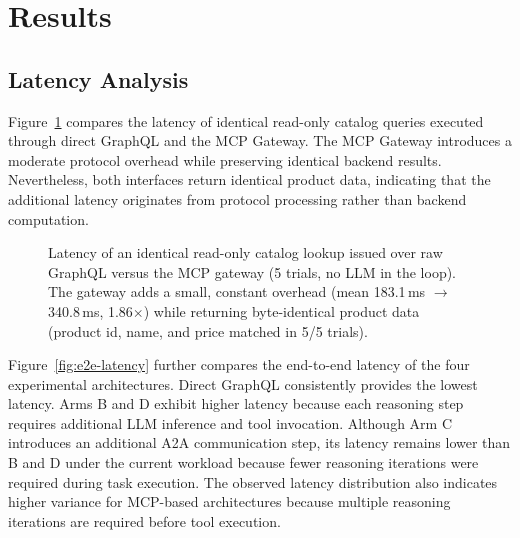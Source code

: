 \documentclass[conference]{IEEEtran}
\begin{document}
\section{Results}
\label{sec:results}

\subsection{Latency Analysis}

Figure~\ref{fig:read-latency} compares the latency of identical read-only
catalog queries executed through direct GraphQL and the MCP Gateway. The MCP
Gateway introduces a moderate protocol overhead while preserving identical
backend results. Nevertheless, both interfaces return identical product
data, indicating that the additional latency originates from protocol
processing rather than backend computation.

\begin{figure}[t]
\centering
{}
\caption{Latency of an identical read-only catalog lookup issued over raw
GraphQL versus the MCP gateway (5 trials, no LLM in the loop). The gateway
adds a small, constant overhead (mean 183.1\,ms $\rightarrow$ 340.8\,ms,
1.86$\times$) while returning byte-identical product data (product id, name,
and price matched in 5/5 trials).}
\label{fig:read-latency}
\end{figure}

Figure~\ref{fig:e2e-latency} further compares the end-to-end latency of the
four experimental architectures. Direct GraphQL consistently provides the
lowest latency. Arms B and D exhibit higher latency because each reasoning
step requires additional LLM inference and tool invocation. Although Arm C
introduces an additional A2A communication step, its latency remains lower
than B and D under the current workload because fewer reasoning iterations
were required during task execution. The observed latency distribution also
indicates higher variance for MCP-based architectures because multiple
reasoning iterations are required before tool execution.
\end{document}
